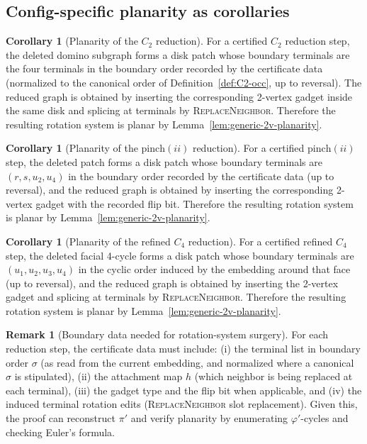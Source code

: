 \documentclass[12pt]{article}
\theoremstyle{definition}
\newtheorem{corollary}[theorem]{Corollary}
\newtheorem{remark}[theorem]{Remark}
\newcommand{\RefinedCFourGadgetVertices}{2}
\newcommand{\CtwoGadgetVertices}{2}
\newcommand{\PinchGadgetVertices}{2}
\begin{document}
\subsection{Config-specific planarity as corollaries}
\label{subsec:config-planarity-cor}

\begin{corollary}[Planarity of the $C_2$ reduction]
\label{cor:planar-C2}
For a certified $C_2$ reduction step, the deleted domino subgraph forms a disk patch whose boundary terminals are the four terminals in the boundary order recorded by the certificate data (normalized to the canonical order of Definition~\ref{def:C2-occ}, up to reversal).
The reduced graph is obtained by inserting the corresponding \CtwoGadgetVertices-vertex gadget inside the same disk and splicing at terminals by \textsc{ReplaceNeighbor}.
Therefore the resulting rotation system is planar by Lemma~\ref{lem:generic-2v-planarity}.
\end{corollary}

\begin{corollary}[Planarity of the $\mathrm{pinch}(ii)$ reduction]
\label{cor:planar-pinchii}
For a certified $\mathrm{pinch}(ii)$ step, the deleted patch forms a disk patch whose boundary terminals are $(r,s,u_2,u_4)$ in the boundary order recorded by the certificate data (up to reversal), and the reduced graph is obtained by inserting the corresponding \PinchGadgetVertices-vertex gadget with the recorded flip bit.
Therefore the resulting rotation system is planar by Lemma~\ref{lem:generic-2v-planarity}.
\end{corollary}

\begin{corollary}[Planarity of the refined $C_4$ reduction]
\label{cor:planar-refinedC4}
For a certified refined $C_4$ step, the deleted facial 4-cycle forms a disk patch whose boundary terminals are $(u_1,u_2,u_3,u_4)$ in the cyclic order induced by the embedding around that face (up to reversal), and the reduced graph is obtained by inserting the \RefinedCFourGadgetVertices-vertex gadget and splicing at terminals by \textsc{ReplaceNeighbor}.
Therefore the resulting rotation system is planar by Lemma~\ref{lem:generic-2v-planarity}.
\end{corollary}

\begin{remark}[Boundary data needed for rotation-system surgery]
For each reduction step, the certificate data must include:
(i) the terminal list in boundary order $\sigma$ (as read from the current embedding, and normalized where a canonical $\sigma$ is stipulated),
(ii) the attachment map $h$ (which neighbor is being replaced at each terminal),
(iii) the gadget type and the flip bit when applicable, and
(iv) the induced terminal rotation edits (\textsc{ReplaceNeighbor} slot replacement).
Given this, the proof can reconstruct $\pi'$ and verify planarity by enumerating $\varphi'$-cycles and checking Euler's formula.
\end{remark}
\end{document}
